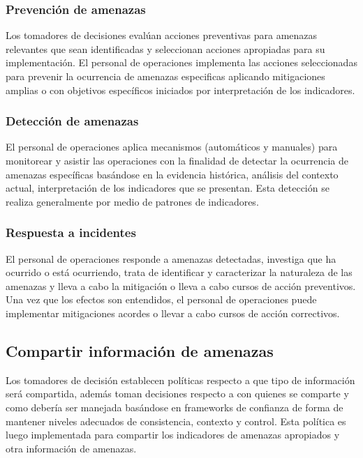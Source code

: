 \subsubsection{Prevención de amenazas}

Los tomadores de decisiones evalúan acciones preventivas para amenazas 
relevantes que sean identificadas y seleccionan acciones apropiadas para su 
implementación. El personal de operaciones implementa las acciones seleccionadas 
para prevenir la ocurrencia de amenazas especificas aplicando mitigaciones 
amplias o con objetivos específicos iniciados por interpretación de los 
indicadores.

\subsubsection{Detección de amenazas}

El personal de operaciones aplica mecanismos (automáticos y manuales) para 
monitorear y asistir las operaciones con la finalidad de detectar la ocurrencia 
de amenazas específicas basándose en la evidencia histórica, análisis del 
contexto actual, interpretación de los indicadores que se presentan. Esta 
detección se realiza generalmente por medio de patrones de indicadores.

\subsubsection{Respuesta a incidentes}

El personal de operaciones responde a amenazas detectadas, investiga que ha 
ocurrido o está ocurriendo, trata de identificar y caracterizar la naturaleza de 
las amenazas y lleva a cabo la mitigación o lleva a cabo cursos de acción 
preventivos. Una vez que los efectos son entendidos, el personal de operaciones 
puede implementar mitigaciones acordes o llevar a cabo cursos de acción 
correctivos.

\subsection{Compartir información de amenazas}
Los tomadores de decisión establecen políticas respecto a que tipo de 
información será compartida, además toman decisiones respecto a con quienes se 
comparte y como debería ser manejada basándose en frameworks de confianza de 
forma de mantener niveles adecuados de consistencia, contexto y control. Esta 
política es luego implementada para compartir los indicadores de amenazas 
apropiados y otra información de amenazas.

